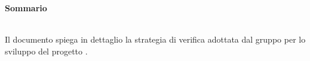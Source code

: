 \noindent\begin{Large}\textbf{Sommario}\end{Large}\\

\noindent 
Il documento spiega in dettaglio la strategia di verifica adottata dal gruppo \gruppo per lo sviluppo del progetto \progetto .\\